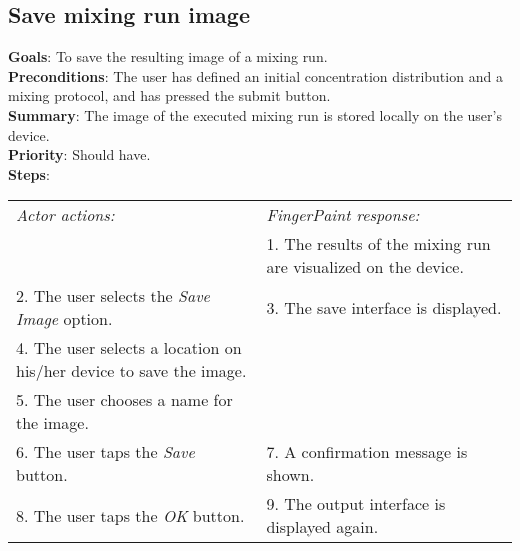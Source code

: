 \begin{appendices}
\section{Save mixing run image}
  \label{savemiximage}
  \textbf{Goals}: To save the resulting image of a mixing run.\\
  \textbf{Preconditions}: The user has defined an initial concentration distribution and a mixing protocol, and has pressed the submit button.\\
  \textbf{Summary}: The image of the executed mixing run is stored locally on the user's device.\\
  \textbf{Priority}: Should have.\\
  \textbf{Steps}: \\
  \begin{tabular}{ p{} p{} }
  	\emph{Actor actions:} & \emph{FingerPaint response:} \\
	   & 1. The results of the mixing run are visualized on the device. \\
	 2. The user selects the \emph{Save Image} option. & 3. The save interface is displayed.\\
	 4. The user selects a location on his/her device to save the image. & \\
	 5. The user chooses a name for the image. & \\
	 6. The user taps the \emph{Save} button. & 7. A confirmation message is shown. \\
	 8. The user taps the \emph{OK} button. & 9. The output interface is displayed again. \\
  \end{tabular}


\end{appendices}
